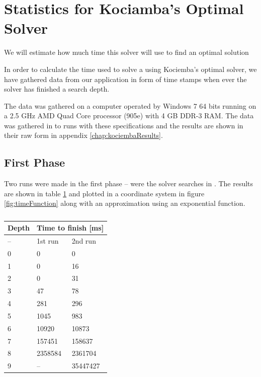 \section{Statistics for Kociamba's Optimal Solver}
\label{app:kociembaTime}
We will estimate how much time this solver will use to find an optimal solution 

In order to calculate the time used to solve a \rubik{} using Kociemba's optimal solver, we have gathered data from our application in form of time stamps when ever the solver has finished a search depth.

The data was gathered on a computer operated by Windows 7 64 bits running on a 2.5 GHz AMD Quad Core processor (905e) with 4 GB DDR-3 RAM.
The data was gathered in to runs with these specifications and the results are shown in their raw form in appendix \ref{chap:kociembaResults}.

\subsection{First Phase}
Two runs were made in the first phase -- were the solver searches in .
The results are shown in table \ref{tab:timeData} and plotted in a coordinate system in figure \ref{fig:timeFunction} along with an approximation using an exponential function.
\begin{table}[htb]
\centering
	\begin{tabular}{|l|l|l|}
	\hline
	Depth& \multicolumn{2}{|c|}{Time to finish [ms]}\\
	\hline
	--&1st run&2nd run\\
	\hline
	0&0&0\\
	\hline
	1&0&16\\
	\hline
	2&0&31\\
	\hline
	3&47&78\\
	\hline
	4&281&296\\
	\hline
	5&1045&983\\
	\hline
	6&10920&10873\\
	\hline
	7&157451&158637\\
	\hline
	8&2358584&2361704\\
	\hline
	9&--&35447427\\
	\hline
	\end{tabular}
\caption{}
	\label{tab:timeData}
\end{table}

